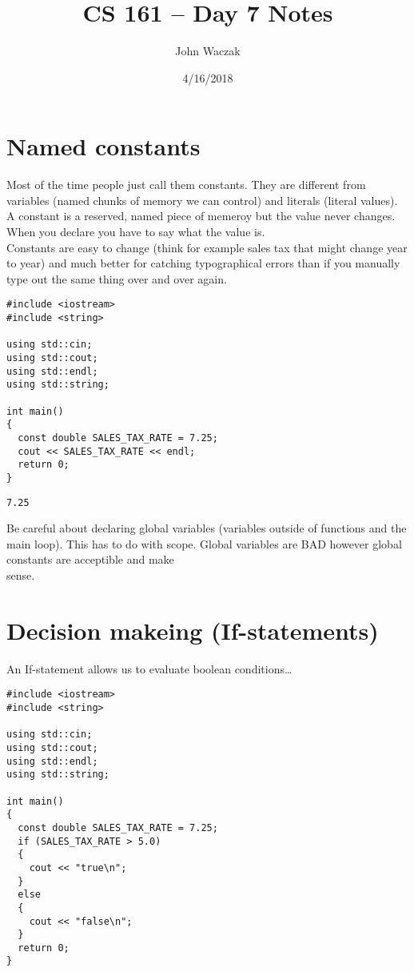 \documentclass[11pt]{article}
\author{John Waczak}
\date{4/16/2018}
\title{CS 161 -- Day 7 Notes}
\begin{document}
\maketitle


\section{Named constants}
\label{sec-1}
Most of the time people just call them constants. They are different
from variables (named chunks of memory we can control) and literals
(literal values). A constant is a reserved, named piece of memeroy
but the value never changes. When you declare you have to say what
the value is. \\

Constants are easy to change (think for example sales tax that might
change year to year) and much better for catching typographical
errors than if you manually type out the same thing over and over
again. \\

\begin{verbatim}
#include <iostream>
#include <string>

using std::cin;
using std::cout;
using std::endl;
using std::string;

int main()
{
  const double SALES_TAX_RATE = 7.25;
  cout << SALES_TAX_RATE << endl;
  return 0;
}
\end{verbatim}

\begin{verbatim}
7.25
\end{verbatim}

Be careful about declaring global variables (variables outside of
functions and the main loop). This has to do with scope. Global
variables are BAD however global constants are acceptible and make \\
  sense.

\section{Decision makeing (If-statements)}
\label{sec-2}
An If-statement allows us to evaluate boolean conditions\ldots{} \\
\begin{verbatim}
#include <iostream>
#include <string>

using std::cin;
using std::cout;
using std::endl;
using std::string;

int main()
{
  const double SALES_TAX_RATE = 7.25;
  if (SALES_TAX_RATE > 5.0)
  {
    cout << "true\n";
  }
  else
  {
    cout << "false\n";
  }
  return 0;
}
\end{verbatim}
\end{document}
